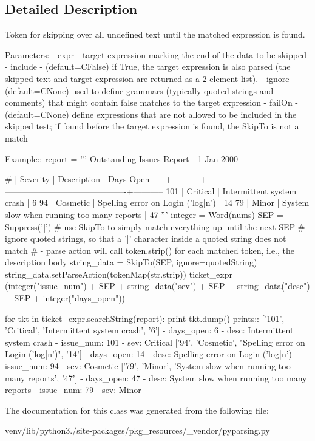 \subsection{Detailed Description}
\begin{DoxyVerb}Token for skipping over all undefined text until the matched expression is found.

Parameters:
 - expr - target expression marking the end of the data to be skipped
 - include - (default=C{False}) if True, the target expression is also parsed 
      (the skipped text and target expression are returned as a 2-element list).
 - ignore - (default=C{None}) used to define grammars (typically quoted strings and 
      comments) that might contain false matches to the target expression
 - failOn - (default=C{None}) define expressions that are not allowed to be 
      included in the skipped test; if found before the target expression is found, 
      the SkipTo is not a match

Example::
    report = '''
        Outstanding Issues Report - 1 Jan 2000

           # | Severity | Description                               |  Days Open
        -----+----------+-------------------------------------------+-----------
         101 | Critical | Intermittent system crash                 |          6
          94 | Cosmetic | Spelling error on Login ('log|n')         |         14
          79 | Minor    | System slow when running too many reports |         47
        '''
    integer = Word(nums)
    SEP = Suppress('|')
    # use SkipTo to simply match everything up until the next SEP
    # - ignore quoted strings, so that a '|' character inside a quoted string does not match
    # - parse action will call token.strip() for each matched token, i.e., the description body
    string_data = SkipTo(SEP, ignore=quotedString)
    string_data.setParseAction(tokenMap(str.strip))
    ticket_expr = (integer("issue_num") + SEP 
                  + string_data("sev") + SEP 
                  + string_data("desc") + SEP 
                  + integer("days_open"))
    
    for tkt in ticket_expr.searchString(report):
        print tkt.dump()
prints::
    ['101', 'Critical', 'Intermittent system crash', '6']
    - days_open: 6
    - desc: Intermittent system crash
    - issue_num: 101
    - sev: Critical
    ['94', 'Cosmetic', "Spelling error on Login ('log|n')", '14']
    - days_open: 14
    - desc: Spelling error on Login ('log|n')
    - issue_num: 94
    - sev: Cosmetic
    ['79', 'Minor', 'System slow when running too many reports', '47']
    - days_open: 47
    - desc: System slow when running too many reports
    - issue_num: 79
    - sev: Minor
\end{DoxyVerb}
 

The documentation for this class was generated from the following file\+:\begin{DoxyCompactItemize}
\item 
venv/lib/python3./site-\/packages/pkg\+\_\+resources/\+\_\+vendor/pyparsing.\+py\end{DoxyCompactItemize}
